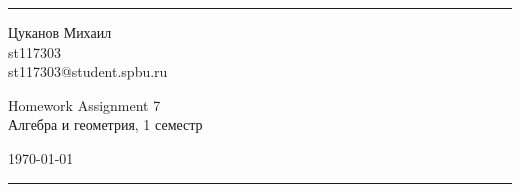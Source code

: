 \documentclass[a4paper, 12pt]{article}
\begin{document}

\fancyhead[C]{}
\hrule \medskip %
\begin{minipage}{0.295\textwidth} 
\raggedright\footnotesize
Цуканов Михаил \hfill\\   
st117303 \hfill\\
st117303@student.spbu.ru
\end{minipage}
\begin{minipage}{0.4\textwidth} 
\centering\large 
Homework Assignment 7\\ 
\normalsize 
Алгебра и геометрия, 1 семестр\\ 
\end{minipage}
\begin{minipage}{0.295\textwidth} 
\raggedleft
\today\hfill\\
\end{minipage}
\medskip\hrule 
\bigskip

\end{document}

